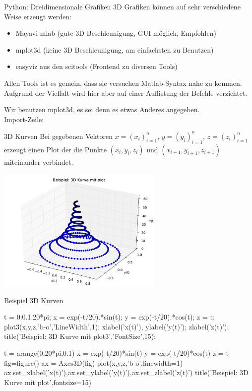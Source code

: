 \documentclass[hyperref={xetex}]{beamer}
\begin{document}
\begin{frame}[fragile]{Python: Dreidimensionale Grafiken}
3D Grafiken können auf sehr verschiedene Weise erzeugt werden:
  \begin{itemize}
    \item \alert{Mayavi mlab} (gute 3D Beschleunigung, GUI möglich, Empfohlen)
  \item \alert{mplot3d} (keine 3D Beschleunigung, am einfachsten zu Benutzen) 
  \item \alert{easyviz} aus den scitools (Frontend zu diversen Tools)
\end{itemize}
Allen Tools ist es gemein, dass sie versuchen Matlab-Syntax nahe zu kommen.
Aufgrund der Vielfalt wird hier aber auf einer Auflistung der Befehle verzichtet.

Wir benutzen \alert{mplot3d}, es sei denn es etwas Anderes angegeben.\\
Import-Zeile: 
\end{frame}
% 
% 
\begin{frame}[fragile]{3D Kurven}
Bei gegebenen Vektoren $x=(x_i)_{i=1}^n$, $y=(y_i)_{i=1}^n$,
$z=(z_i)_{i=1}^n$ erzeugt \alert{ } einen Plot der die Punkte
$(x_i,y_i,z_i)$ und $(x_{i+1},y_{i+1},z_{i+1})$ miteinander
verbindet. \\
\begin{center}\includegraphics[width=0.6\textwidth]{figures/plot3d_py}\end{center}
\end{frame}
% 
% 
\begin{frame}[fragile]{Beispiel 3D Kurven}
\begin{matlabin}
t = 0:0.1:20*pi;
x = exp(-t/20).*sin(t);
y = exp(-t/20).*cos(t);
z = t;
plot3(x,y,z,'b-o','LineWidth',1);
xlabel('x(t)'), ylabel('y(t)');
 zlabel('z(t)');
title('Beispiel: 3D Kurve mit plot3','FontSize',15);
\end{matlabin}
\begin{pyin}
t = arange(0,20*pi,0.1)
x = exp(-t/20)*sin(t)
y = exp(-t/20)*cos(t)
z = t
fig=figure()
ax = Axes3D(fig)
plot(x,y,z,'b-o',linewidth=1)
ax.set_xlabel('x(t)'),ax.set_ylabel('y(t)'),ax.set_zlabel('z(t)')
title('Beispiel: 3D Kurve mit plot',fontsize=15)  
\end{pyin}
\end{frame}
\end{document}
